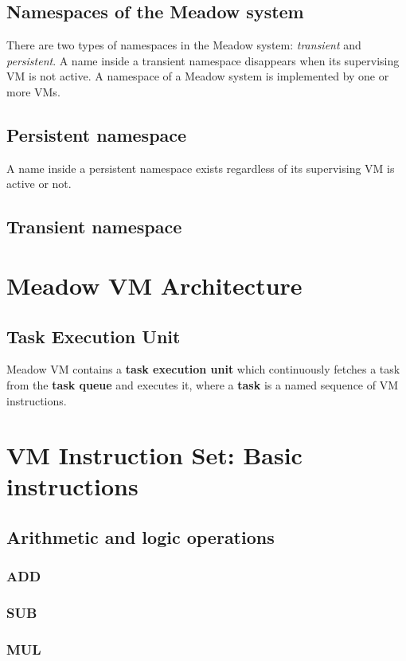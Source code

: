 \documentclass{note}
\begin{document}
\subsection{Namespaces of the Meadow system}
There are two types of namespaces in the Meadow system: {\em transient\/} and
{\em persistent\/}. A name inside a transient namespace disappears when its
supervising VM is not active. 
A namespace of a Meadow system is implemented by one or more VMs.

\subsection{Persistent namespace}
A name inside a persistent namespace exists regardless of its
supervising VM is active or not.

\subsection{Transient namespace}


\section{Meadow VM Architecture}
\subsection{Task Execution Unit}
Meadow VM contains a \textcolor{red2}{\bf{}task execution unit} which
continuously fetches a task from the \textcolor{red2}{\bf{}task queue}
and executes it, where a \textcolor{red2}{\bf{}task} is a named sequence of VM
instructions.  


\section{VM Instruction Set: Basic instructions}

\subsection{Arithmetic and logic operations}
\subsubsection{ADD}
\subsubsection{SUB}
\subsubsection{MUL}
\end{document}
